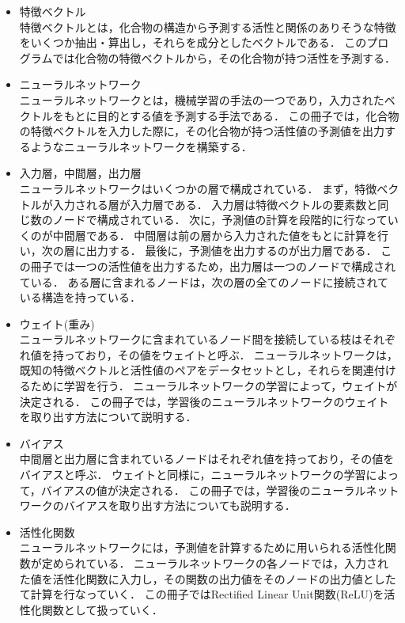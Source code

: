 \documentclass[11pt,titlepage,dvipdfmx,twoside]{jarticle}
\begin{document}
\begin{itemize}
\item 特徴ベクトル\\
特徴ベクトルとは，化合物の構造から予測する活性と関係のありそうな特徴をいくつか抽出・算出し，それらを成分としたベクトルである．
このプログラムでは化合物の特徴ベクトルから，その化合物が持つ活性を予測する．

\item ニューラルネットワーク \\
ニューラルネットワークとは，機械学習の手法の一つであり，入力されたベクトルをもとに目的とする値を予測する手法である．
この冊子では，化合物の特徴ベクトルを入力した際に，その化合物が持つ活性値の予測値を出力するようなニューラルネットワークを構築する．

\item 入力層，中間層，出力層\\
ニューラルネットワークはいくつかの層で構成されている．
まず，特徴ベクトルが入力される層が入力層である．
入力層は特徴ベクトルの要素数と同じ数のノードで構成されている．
次に，予測値の計算を段階的に行なっていくのが中間層である．
中間層は前の層から入力された値をもとに計算を行い，次の層に出力する．
最後に，予測値を出力するのが出力層である．
この冊子では一つの活性値を出力するため，出力層は一つのノードで構成されている．
ある層に含まれるノードは，次の層の全てのノードに接続されている構造を持っている．

\item ウェイト(重み)\\
ニューラルネットワークに含まれているノード間を接続している枝はそれぞれ値を持っており，その値をウェイトと呼ぶ．
ニューラルネットワークは，既知の特徴ベクトルと活性値のペアをデータセットとし，それらを関連付けるために学習を行う．
ニューラルネットワークの学習によって，ウェイトが決定される．
この冊子では，学習後のニューラルネットワークのウェイトを取り出す方法について説明する．

\item バイアス\\
中間層と出力層に含まれているノードはそれぞれ値を持っており，その値をバイアスと呼ぶ．
ウェイトと同様に，ニューラルネットワークの学習によって，バイアスの値が決定される．
この冊子では，学習後のニューラルネットワークのバイアスを取り出す方法についても説明する．

\item 活性化関数\\
ニューラルネットワークには，予測値を計算するために用いられる活性化関数が定められている．
ニューラルネットワークの各ノードでは，入力された値を活性化関数に入力し，その関数の出力値をそのノードの出力値としたて計算を行なっていく．
この冊子ではRectified Linear Unit関数(ReLU)を活性化関数として扱っていく．


\end{itemize}
\end{document}
